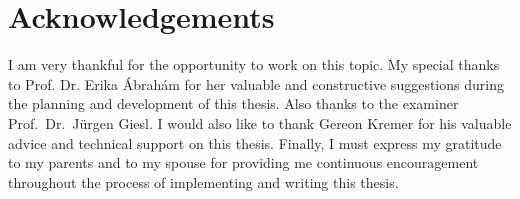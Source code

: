 \section*{Acknowledgements}
I am very thankful for the opportunity to work on this topic.
My special thanks to Prof. Dr. Erika \'Abrah\'am for her valuable and constructive suggestions during the planning and development of this thesis.
Also thanks to the examiner Prof.~Dr.~Jürgen Giesl.
I would also like to thank Gereon Kremer for his valuable advice and technical support on this thesis. 
Finally, I must express my gratitude to my parents and to my spouse for providing me continuous encouragement throughout the process of implementing and writing this thesis.
